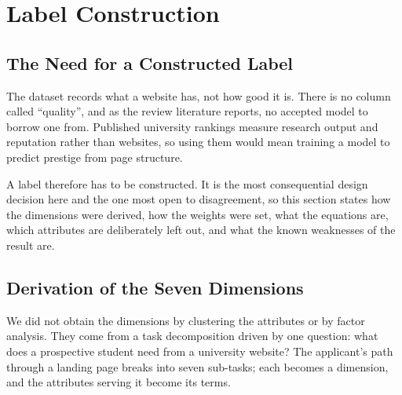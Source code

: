 \documentclass[11pt,a4paper]{article}
\begin{document}
\begin{table}[H]\centering\small
\caption{Spread of each dimension across the \nUni{} universities. A dimension can differentiate
only to the extent that universities actually differ on it.}
\label{tab:dimspread}

\end{table}

\section{Label Construction}
\label{sec:label}

\subsection{The Need for a Constructed Label}

The dataset records what a website has, not how good it is. There is no column called ``quality'',
and as the review literature reports, no accepted model to borrow one from. Published university
rankings measure research output and reputation rather than websites, so using them would mean
training a model to predict prestige from page structure.

A label therefore has to be constructed. It is the most consequential design decision here and the
one most open to disagreement, so this section states how the dimensions were derived, how the
weights were set, what the equations are, which attributes are deliberately left out, and what the
known weaknesses of the result are.

\subsection{Derivation of the Seven Dimensions}
\label{sec:derivation}

We did not obtain the dimensions by clustering the attributes or by factor analysis. They come from
a task decomposition driven by one question: what does a prospective student need from a university
website? The applicant's path through a landing page breaks into seven sub-tasks; each becomes a
dimension, and the attributes serving it become its terms.
\end{document}
